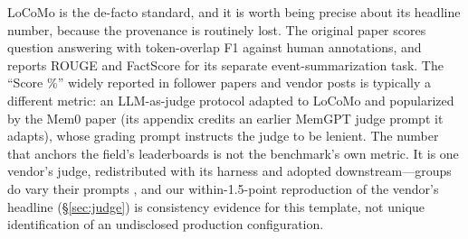 \documentclass[11pt]{article}
\begin{document}
LoCoMo\citep{locomo} is the de-facto standard, and it is worth being precise about its headline number, because the provenance is routinely lost. The original paper scores question answering with token-overlap F1 against human annotations, and reports ROUGE and FactScore for its separate event-summarization task. The ``Score \%'' widely reported in follower papers and vendor posts is typically a different metric: an LLM-as-judge protocol adapted to LoCoMo and popularized by the Mem0 paper\citep{mem0} (its appendix credits an earlier MemGPT judge prompt it adapts), whose grading prompt instructs the judge to be lenient. The number that anchors the field's leaderboards is not the benchmark's own metric. It is one vendor's judge, redistributed with its harness and adopted downstream---groups do vary their prompts \citep{synthius}, and our within-1.5-point reproduction of the vendor's headline (\S\ref{sec:judge}) is consistency evidence for this template, not unique identification of an undisclosed production configuration.
\end{document}
